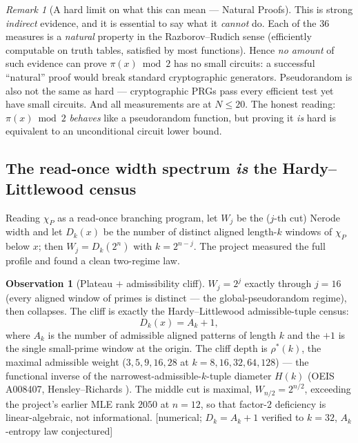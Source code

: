 \documentclass[11pt]{article}
\theoremstyle{plain}
\theoremstyle{definition}
\newtheorem{observation}[theorem]{Observation}
\theoremstyle{remark}
\newtheorem{remark}[theorem]{Remark}
\newcommand{\stat}[1]{\quad\textnormal{\footnotesize\textsf{[\textcolor{accent}{#1}]}}}
\newcommand{\chiP}{\chi_{P}}
\begin{document}
\begin{remark}[A hard limit on what this can mean --- Natural Proofs]
\label{rem:natural}
This is strong \emph{indirect} evidence, and it is essential to say what it
\emph{cannot} do. Each of the $36$ measures is a \emph{natural} property in the
Razborov--Rudich sense \cite{razborovrudich1997} (efficiently computable on truth
tables, satisfied by most functions). Hence \emph{no amount} of such evidence can
prove $\pi(x)\bmod2$ has no small circuits: a successful ``natural'' proof would
break standard cryptographic generators. Pseudorandom is also not the same as
hard --- cryptographic PRGs pass every efficient test yet have small circuits.
And all measurements are at $N\le 20$. The honest reading: $\pi(x)\bmod2$
\emph{behaves} like a pseudorandom function, but proving it \emph{is} hard is
equivalent to an unconditional circuit lower bound.
\end{remark}

\subsection{The read-once width spectrum \emph{is} the Hardy--Littlewood census}

Reading $\chiP$ as a read-once branching program, let $W_j$ be the
($j$-th cut) Nerode width and let $D_k(x)$ be the number of distinct aligned
length-$k$ windows of $\chiP$ below $x$; then $W_j=D_k(2^n)$ with $k=2^{n-j}$. The
project measured the full profile and found a clean two-regime law.

\begin{observation}[Plateau $+$ admissibility cliff]
\label{obs:width}
$W_j=2^j$ exactly through $j=16$ (every aligned window of primes is distinct ---
the global-pseudorandom regime), then collapses. The cliff is exactly the
Hardy--Littlewood admissible-tuple census:
\[
  D_k(x) = A_k + 1,
\]
where $A_k$ is the number of admissible aligned patterns of length $k$ and the
$+1$ is the single small-prime window at the origin. The cliff depth is
$\rho^*(k)$, the maximal admissible weight ($3,5,9,16,28$ at
$k=8,16,32,64,128$) --- the functional inverse of the narrowest-admissible-$k$-tuple
diameter $H(k)$ (OEIS A008407, Hensley--Richards \cite{hensleyrichards1974}). The
middle cut is maximal, $W_{n/2}=2^{n/2}$, exceeding the project's earlier MLE rank
$2050$ at $n=12$, so that factor-$2$ deficiency is linear-algebraic, not
informational.
\stat{numerical; $D_k=A_k+1$ verified to $k=32$, $A_k$-entropy law conjectured}
\end{observation}
\end{document}
